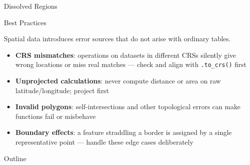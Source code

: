 \documentclass[8pt,aspectratio=169]{beamer}
\begin{document}
\begin{rightframe}{Dissolved Regions}
\end{rightframe}

\begin{textframe}{Best Practices}

Spatial data introduces error sources that do not arise with ordinary tables.

\begin{itemize}
\item \textbf{CRS mismatches}: operations on datasets in different CRSs silently give wrong locations or miss real matches --- check and align with \texttt{.to\_crs()} first
\item \textbf{Unprojected calculations}: never compute distance or area on raw latitude/longitude; project first
\item \textbf{Invalid polygons}: self-intersections and other topological errors can make functions fail or misbehave
\item \textbf{Boundary effects}: a feature straddling a border is assigned by a single representative point --- handle these edge cases deliberately
\end{itemize}

\end{textframe}

\begin{outlineframe}{Outline}
\end{outlineframe}
\end{document}
